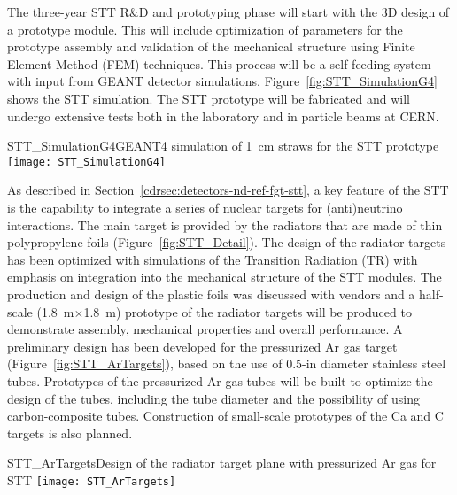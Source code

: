The three-year STT R\&D and prototyping phase will start with the 3D
design of a prototype module.  This will include optimization of
parameters for the prototype assembly and validation of the mechanical
structure using Finite Element Method (FEM) techniques. This process
will be a self-feeding system with input from GEANT detector
simulations.  Figure~\ref{fig:STT_SimulationG4} shows the STT
simulation.  
The STT prototype will be fabricated and will undergo
extensive tests both in the laboratory and 
in particle beams at CERN.
\begin{cdrfigure}
{STT_SimulationG4}{GEANT4 simulation of 1~cm straws for the STT prototype}
\texttt{[image: STT\_SimulationG4]}
\end{cdrfigure}



As described in Section~\ref{cdrsec:detectors-nd-ref-fgt-stt}, a key
feature of the STT is the capability to integrate a series of
nuclear targets for (anti)neutrino interactions.  The main
target is provided by the radiators that are made of thin polypropylene foils
(Figure~\ref{fig:STT_Detail}).  The design of the radiator targets has
been optimized with simulations of the Transition Radiation (TR)
with emphasis on integration into the mechanical structure of
the STT modules.  The production and design of the plastic foils was
discussed with vendors and a half-scale
(1.8~m$\times$1.8~m) prototype of the radiator targets will be produced to demonstrate
assembly, mechanical properties and overall
performance.
A preliminary design has been developed for the
pressurized Ar gas target (Figure~\ref{fig:STT_ArTargets}), based on
the use of 0.5-in diameter stainless steel tubes.
Prototypes of the pressurized Ar gas tubes will be built to 
optimize the design of the tubes, including the tube diameter
and the possibility of using carbon-composite tubes. 
Construction of small-scale prototypes of the Ca and C targets is also planned.
\begin{cdrfigure}
{STT_ArTargets}{Design of the radiator target plane with pressurized Ar gas for STT}
\texttt{[image: STT\_ArTargets]}
\end{cdrfigure}


